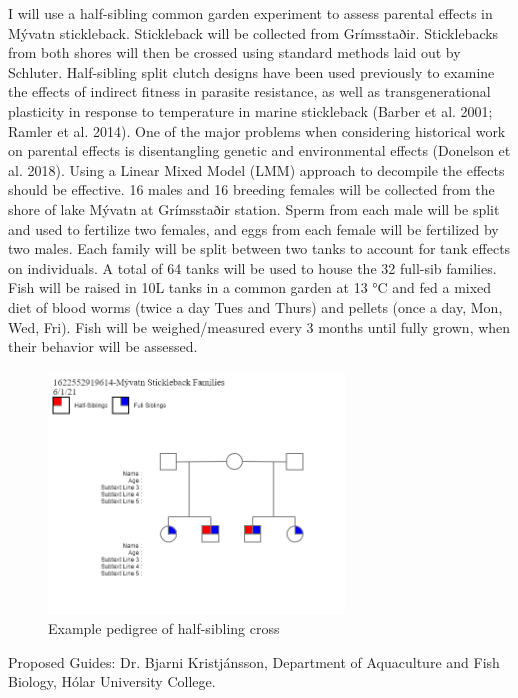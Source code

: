 \documentclass[12pt]{extarticle}
\begin{document}
I will use a half-sibling common garden experiment to assess parental effects in Mývatn stickleback. Stickleback will be collected from Grímsstaðir. Sticklebacks from both shores will then be crossed using standard methods laid out by Schluter. Half-sibling split clutch designs have been used previously to examine the effects of indirect fitness in parasite resistance, as well as transgenerational plasticity in response to temperature in marine stickleback (Barber et al. 2001; Ramler et al. 2014). One of the major problems when considering historical work on parental effects is disentangling genetic and environmental effects (Donelson et al. 2018). Using a Linear Mixed Model (LMM) approach to decompile the effects should be effective. 16 males and 16 breeding females will be collected from the shore of lake M\'yvatn at Grímsstaðir station. Sperm from each male will be split and used to fertilize two females, and eggs from each female will be fertilized by two males. Each family will be split between two tanks to account for tank effects on individuals. A total of 64 tanks will be used to house the 32 full-sib families. Fish will be raised in 10L tanks in a common garden at 13 °C and fed a mixed diet of blood worms (twice a day Tues and Thurs) and pellets (once a day, Mon, Wed, Fri). Fish will be weighed/measured every 3 months until fully grown, when their behavior will be assessed.

\begin{figure}
\centering
 \includegraphics[width=0.7\textwidth]{pedigree}
 \caption{Example pedigree of half-sibling cross}
  \label{fig:pedigree1}
\end{figure}


Proposed Guides: Dr. Bjarni Kristj\'ansson, Department of Aquaculture and Fish Biology, H\'olar University College.

\end{document}
